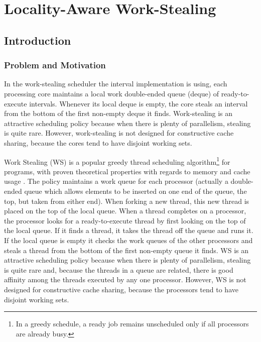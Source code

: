 
\part{Locality-Aware Work-Stealing}
\label{part:locality}

\chapter{Introduction}
\label{chap:locality-introduction}

\section{Problem and Motivation}
\label{sec:locality-intro-problem-and-motivation}


In the work-stealing scheduler the interval implementation is using,
each processing core maintains a local work double-ended queue (deque)
of ready-to-execute intervals. Whenever its local deque is empty, the
core steals an interval from the bottom of the first non-empty deque
it finds. Work-stealing is an attractive scheduling policy because
when there is plenty of parallelism, stealing is quite rare. However,
work-stealing is not designed for constructive cache sharing, because
the cores tend to have disjoint working sets.


Work Stealing (WS) is a popular greedy thread scheduling
algorithm\footnote{In a greedy schedule, a ready job remains
  unscheduled only if all processors are already busy.} for programs,
with proven theoretical properties with regards to memory and cache
usage \cite{Blumofe1998a, Blumofe1999, Acar2002}. The policy maintains
a work queue for each processor (actually a double-ended queue which
allows elements to be inserted on one end of the queue, the top, but
taken from either end). When forking a new thread, this new thread is
placed on the top of the local queue. When a thread completes on a
processor, the processor looks for a ready-to-execute thread by first
looking on the top of the local queue. If it finds a thread, it takes
the thread off the queue and runs it. If the local queue is empty it
checks the work queues of the other processors and steals a thread
from the bottom of the first non-empty queue it finds. WS is an
attractive scheduling policy because when there is plenty of
parallelism, stealing is quite rare and, because the threads in a
queue are related, there is good affinity among the threads executed
by any one processor. However, WS is not designed for constructive
cache sharing, because the processors tend to have disjoint working
sets.

